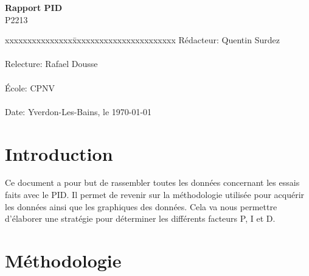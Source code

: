 \documentclass[
	a4paper,									%
	11pt,										%
	twoside,									%
	openright,									%
	notitlepage,									%
	parskip=half,								%
]{scrreprt}										%
\begin{document}
\begin{titlepage}
	\vspace{3cm}

	\fontsize{30pt}{32pt}\selectfont 
	\noindent \textbf{Rapport PID} \\

	\fontsize{18pt}{20pt}\selectfont\vspace{0.3em} P2213 \\

	\vspace{4cm}
	\fontsize{12pt}{15pt}\selectfont
	\begin{tabbing}
		xxxxxxxxxxxxxxx\=xxxxxxxxxxxxxxxxxxxxxxx \kill
		Rédacteur:\> Quentin Surdez\\ \\
		Relecture:\> Rafael Dousse\\ \\
		École:\> CPNV\\ \\
		Date:\> Yverdon-Les-Bains, le \today \\
	\end{tabbing}
\end{titlepage}

\tableofcontents

\cleardoublepage

\setcounter{page}{1}

\chapter{Introduction}
Ce document a pour but de rassembler toutes les données concernant les essais faits avec le PID. Il permet 
de revenir sur la méthodologie utilisée pour acquérir les données ainsi que les graphiques des données. 
Cela va nous permettre d'élaborer une stratégie pour déterminer les différents facteurs P, I et D. \par


\chapter{Méthodologie}
\end{document}
